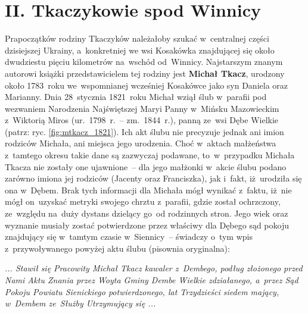 
\newpage
\renewcommand{\thefigure}{Z2.\arabic{figure}}
\setcounter{figure}{0}

\section*{II. Tkaczykowie spod Winnicy}
\label{sec:tkaczykowie}

Prapoczątków rodziny Tkaczyków należałoby szukać w~centralnej części
dzisiejszej Ukrainy, a~konkretniej we wsi Kosakówka znajdującej się około
dwudziestu pięciu kilometrów na~wschód od~Winnicy. Najstarszym znanym autorowi
książki przedstawicielem tej rodziny jest
\textbf{Michał Tkacz}, urodzony
około 1783~roku we~wspomnianej wcześniej Kosakówce jako syn Daniela oraz
Marianny. Dnia 28~stycznia 1821~roku Michał wziął ślub w~parafii pod wezwaniem
Narodzenia Najświętszej Maryi Panny w~Mińsku Mazowieckim z~Wiktorią
Miros
(ur.~1798~r.~-- zm.~1844~r.), panną ze~wsi Dębe Wielkie (patrz: ryc.
\ref{fig:mtkacz_1821}). Ich akt ślubu nie precyzuje jednak ani imion rodziców
Michała, ani miejsca jego urodzenia. Choć w~aktach małżeństwa z~tamtego okresu
takie dane są zazwyczaj podawane, to~w~przypadku Michała
Tkacza nie zostały one
ujawnione~-- dla jego małżonki w~akcie ślubu podano zarówno imiona jej
rodziców (Jacenty oraz Franciszka), jak i~fakt, iż~urodziła się ona w~Dębem.
Brak tych informacji dla Michała mógł wynikać z~faktu, iż~nie mógł on~uzyskać
metryki swojego chrztu z~parafii, gdzie został ochrzczony, ze~względu na~duży
dystans dzielący go~od rodzinnych stron. Jego wiek oraz wyznanie musiały
zostać potwierdzone przez właściwy dla Dębego sąd pokoju znajdujący się
w~tamtym czasie w~Siennicy~-- świadczy o~tym wpis z~przywoływanego powyżej
aktu ślubu (pisownia oryginalna):

\begin{centeredquote}
    \textit{... Stawił się Pracowity Michał Tkacz kawaler z~Dembego, podług
    złożonego przed Nami Aktu Znania przez Woyta Gminy Dembe Wielkie
    zdziałanego, a~przez Sąd Pokoju Powiatu Sienickiego potwierdzonego,
    lat Trzydzieści siedem mający, w~Dembem ze~Służby Utrzymujący się ...}
\end{centeredquote}

